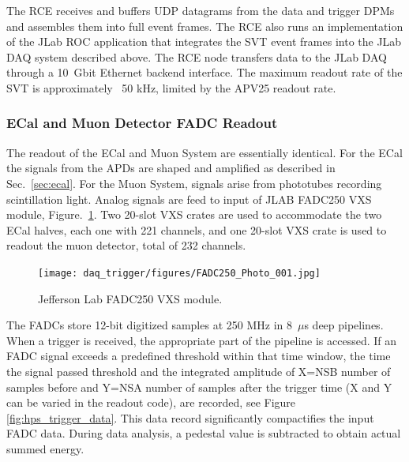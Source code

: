 The RCE receives and buffers UDP datagrams from the data and trigger DPMs and
 assembles them into full event frames. The RCE also runs an implementation of the JLab ROC application 
that integrates the SVT event frames into the JLab DAQ 
 system described above. The RCE node transfers data to the JLab DAQ  
 through a 10~Gbit Ethernet backend interface. The maximum readout rate of the SVT is approximately 
~50 kHz, limited by the APV25 readout rate. 










\subsubsection{ECal and Muon Detector FADC Readout}
\label{sec:fadc_daq}
The readout of the ECal and Muon System are essentially identical. For the ECal the signals from the APDs are 
shaped and amplified as described in Sec.~\ref{sec:ecal}. For the Muon System, signals arise from phototubes recording scintillation light.
Analog signals are feed to input of JLAB FADC250 VXS module, Figure.~\ref{fig:fadc}. Two 20-slot VXS crates are used to accommodate the two ECal 
halves, each one with 221 channels, and one 20-slot VXS crate is used to readout the muon detector, total of 232 channels. 

\begin{figure}[t]
\texttt{[image: daq\_trigger/figures/FADC250\_Photo\_001.jpg]}
\caption{\small{Jefferson Lab FADC250 VXS module.}}
\label{fig:fadc}
\end{figure}

The FADCs store 12-bit digitized samples at 250 MHz in 8~$\mu$s deep pipelines. 
When a trigger is received, the appropriate part of the pipeline is accessed. If an FADC   
signal exceeds a predefined threshold within that time window, the time the signal passed threshold and the integrated
amplitude of X=NSB number of samples before and Y=NSA number of samples after the trigger time (X and Y can be varied in the readout code), are recorded, see Figure \ref{fig:hps_trigger_data}. This data record significantly compactifies the input FADC data. During data analysis, a pedestal value is subtracted to obtain actual summed energy.

